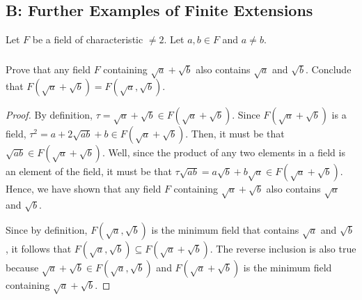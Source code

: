 \documentclass[12pt]{article}
\begin{document}
\subsection{B: Further Examples of Finite Extensions}
Let $F$ be a field of characteristic $\neq 2$. Let $a, b \in F$ and $a \neq b $.

\subsubsection{}
Prove that any field $F$ containing $\sqrt{a} + \sqrt{b}$ also contains $\sqrt{a}$ and $\sqrt{b}$.
Conclude that $F(\sqrt{a} + \sqrt{b}) = F(\sqrt{a}, \sqrt{b})$.

\begin{proof}
By definition, $\tau = \sqrt{a}+\sqrt{b} \in F(\sqrt{a} + \sqrt{b})$.
Since $F(\sqrt{a} + \sqrt{b})$ is a field, $\tau^2 = a+2\sqrt{ab}+b \in F(\sqrt{a} + \sqrt{b})$.
Then, it must be that $\sqrt{ab} \in F(\sqrt{a} + \sqrt{b})$.
Well, since the product of any two elements in a field is an element of the field,
it must be that $\tau\sqrt{ab} = a\sqrt{b}+b\sqrt{a} \in F(\sqrt{a} + \sqrt{b})$.
Hence, we have shown that any field $F$ containing $\sqrt{a} + \sqrt{b}$ also contains $\sqrt{a}$ and $\sqrt{b}$.

Since by definition, $F(\sqrt{a}, \sqrt{b})$ is the minimum field that contains
$\sqrt{a}$ and $\sqrt{b}$, it follows that $F(\sqrt{a}, \sqrt{b}) \subseteq F(\sqrt{a} + \sqrt{b})$.
The reverse inclusion is also true because $\sqrt{a}+\sqrt{b} \in F(\sqrt{a}, \sqrt{b})$
and $F(\sqrt{a}+\sqrt{b})$ is the minimum field containing $\sqrt{a} + \sqrt{b}$.
\end{proof}
\end{document}
